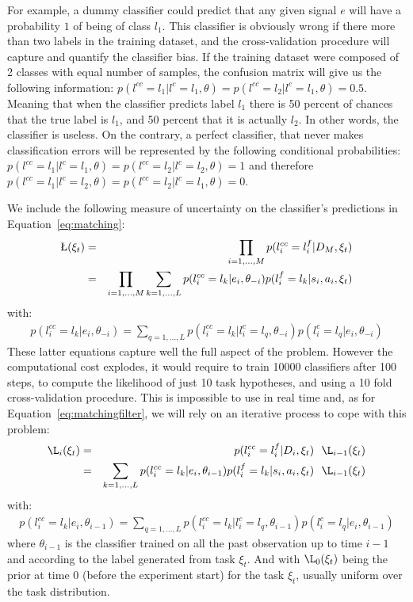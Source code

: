 For example, a dummy classifier could predict that any given signal $e$ will have a probability $1$ of being of class $l_1$. This classifier is obviously wrong if there more than two labels in the training dataset, and the cross-validation procedure will capture and quantify the classifier bias. If the training dataset were composed of 2 classes with equal number of samples, the confusion matrix will give us the following information: $p(l^{cc} = l_1| l^c = l_1, \theta) = p(l^{cc} = l_2| l^c = l_1, \theta) = 0.5$. Meaning that when the classifier predicts label $l_1$ there is 50 percent of chances that the true label is $l_1$, and 50 percent that it is actually $l_2$. In other words, the classifier is useless. On the contrary, a perfect classifier, that never makes classification errors will be represented by the following conditional probabilities: $p(l^{cc} = l_1| l^c = l_1, \theta) = p(l^{cc} = l_2| l^c = l_2, \theta) = 1$ and therefore $p(l^{cc} = l_1| l^c = l_2, \theta) = p(l^{cc} = l_2| l^c = l_1, \theta) = 0$.

We include the following measure of uncertainty on the classifier's predictions in Equation~\ref{eq:matching}:
%
\begin{eqnarray}
\L(\xi_t) &=& \prod_{i = 1,\ldots,M} p(l^{cc}_i = l^f_i | D_M, \xi_t) \nonumber \\ 
&=& \prod_{i = 1,\ldots,M} \sum_{k = 1, \ldots, L} p(l^{cc}_i = l_k | e_i, \theta_{-i}) p(l^f_i = l_k | s_i, a_i, \xi_t)
\label{eq:matchingcrossvalidation} 
\end{eqnarray}
%
with:
%
\begin{eqnarray}
p(l^{cc}_i = l_k | e_i, \theta_{-i}) =  \sum_{q = 1, \ldots, L} p(l^{cc}_i = l_k| l^c_i = l_q, \theta_{-i}) p(l^c_i = l_q | e_i, \theta_{-i})
\label{eq:confusion} 
\end{eqnarray}
%
These latter equations capture well the full aspect of the problem. However the computational cost explodes, it would require to train 10000 classifiers after 100 steps, to compute the likelihood of just 10 task hypotheses, and using a 10 fold cross-validation procedure. This is impossible to use in real time and, as for Equation~\ref{eq:matchingfilter}, we will rely on an iterative process to cope with this problem:
%
\begin{eqnarray}
\L_i(\xi_t) &=& p(l^{cc}_i = l^f_i | D_i, \xi_t) ~~ \L_{i-1}(\xi_t) \nonumber \\ 
&=& \sum_{k = 1, \ldots, L} p(l^{cc}_i = l_k | e_i, \theta_{i-1}) p(l^f_i = l_k | s_i, a_i, \xi_t) ~~ \L_{i-1}(\xi_t)
\label{eq:matchingfiltercrossvalidation} 
\end{eqnarray}
%
with:
%
\begin{eqnarray}
p(l^{cc}_i = l_k | e_i, \theta_{i-1}) =  \sum_{q = 1, \ldots, L} p(l^{cc}_i = l_k| l^c_i = l_q, \theta_{i-1}) p(l^c_i = l_q | e_i, \theta_{i-1})
\label{eq:confusionfilter} 
\end{eqnarray}
%
where $\theta_{i-1}$ is the classifier trained on all the past observation up to time $i-1$ and according to the label generated from task $\xi_t$. And with $\L_{0}(\xi_t)$ being the prior at time 0 (before the experiment start) for the task $\xi_t$, usually uniform over the task distribution.

